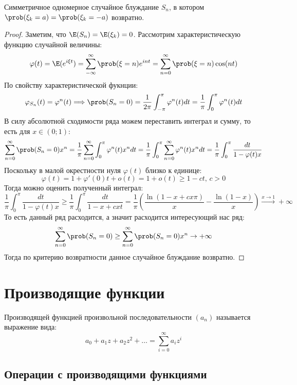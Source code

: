 \documentclass[12pt]{article}
\begin{document}
\begin{theorem}
    Симметричное одномерное случайное блуждание $S_n$, в котором $\prob(\xi_k=a)=\prob(\xi_k=-a)$ возвратно.
\end{theorem}
\begin{proof}
    Заметим, что $\E(S_n)=\E(\xi_k)=0$. Рассмотрим характеристическую функцию случайной величины:
    $$\varphi(t)=\E(e^{i\xi t})=\sum_{-\infty}^{\infty}\prob(\xi=n)e^{int}=\sum_{n=0}^{\infty}\prob(\xi=n)\cos(nt)$$
    По свойству характеристической фукнции:
    $$\varphi_{S_n}(t)=\varphi^n(t)\Longrightarrow \prob(S_n=0)=\frac{1}{2\pi}\int_{-\pi}^{\pi}\varphi^n(t)dt=\frac{1}{\pi}\int_{0}^{\pi}\varphi^n(t)dt$$
    В силу абсолютной сходимости ряда можем переставить интеграл и сумму, то есть для $x\in(0;1)$:
    $$\sum_{n=0}^{\infty}\prob(S_n=0)x^n=\frac{1}{\pi}\sum_{n=0}^{\infty}\int_{0}^{\pi}\varphi^n(t)x^ndt=\frac{1}{\pi}\int_{0}^{\pi}\sum_{n=0}^{\infty}\varphi^n(t)x^ndt=\frac{1}{\pi}\int_{0}^{\pi}\frac{dt}{1-\varphi(t)x}$$
    Поскольку в малой окрестности нуля $\varphi(t)$ близко к единице:
    $$\varphi(t)=1+\varphi'(0)t+o(t)=1+o(t)\geq 1-ct,\, c>0$$
    Тогда можно оценить полученный интеграл:
    $$\frac{1}{\pi}\int_{0}^{\pi}\frac{dt}{1-\varphi(t)x}\geq \frac{1}{\pi}\int_{0}^{\pi}\frac{dt}{1-x+cxt}=\frac{1}{\pi}\left(\frac{\ln(1-x+cx\pi)}{x}-\frac{\ln(1-x)}{x}\right)\xrightarrow{x\to1}+\infty$$
    То есть данный ряд расходится, а значит расходится интересующий нас ряд:
    $$\sum_{n=0}^{\infty}\prob(S_n=0)\geq\sum_{n=0}^{\infty}\prob(S_n=0)x^n\to+\infty$$
    Тогда по критерию возвратности данное случайное блуждание возвратно.
\end{proof}

\section{Производящие функции}

\begin{definition}
    Производящей функцией произвольной последовательности $(a_n)$ называется выражение вида:
    $$a_0+a_1z+a_2z^2+\ldots=\sum_{i=0}^{\infty}a_iz^i$$
\end{definition}

\subsection{Операции с производящими функциями}
\end{document}

